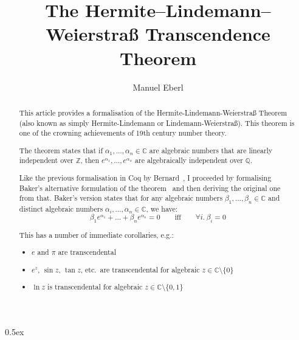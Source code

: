\documentclass[11pt,a4paper]{article}
\begin{document}
\title{The Hermite--Lindemann--Weierstraß Transcendence Theorem}
\author{Manuel Eberl}
\maketitle

\begin{abstract}
This article provides a formalisation of the Her\-mite\--Lin\-de\-mann\--Wei\-er\-straß Theorem
(also known as simply Her\-mite\--Lin\-de\-mann or Lin\-de\-mann\--Wei\-er\-straß).
 This theorem is one of the crowning achievements of 19th century number theory.

The theorem states that if $\alpha_1, \ldots, \alpha_n\in\mathbb{C}$ are algebraic numbers that
are linearly independent over $\mathbb{Z}$, then $e^{\alpha_1},\ldots,e^{\alpha_n}$ are
algebraically independent over $\mathbb{Q}$.

Like the previous formalisation in Coq by Bernard~\cite{bernard}, I proceeded by formalising 
Baker's alternative formulation of the theorem~\cite{baker} and then deriving the original one from
that. Baker's version states that for any algebraic numbers
$\beta_1, \ldots, \beta_n\in\mathbb{C}$ and distinct algebraic numbers
$\alpha_i, \ldots, \alpha_n\in\mathbb{C}$, we have:
\[\beta_1 e^{\alpha_1} + \ldots + \beta_n e^{\alpha_n} = 0 \quad\quad\text{iff}\quad\quad
  \forall i.\ \beta_i = 0\]

This has a number of immediate corollaries, e.g.:
\begin{itemize}
\item $e$ and $\pi$ are transcendental
\item $e^z$, $\sin z$, $\tan z$, etc.\ are transcendental for algebraic $z\in\mathbb{C}\setminus\{0\}$
\item $\ln z$ is transcendental for algebraic $z\in\mathbb{C}\setminus\{0, 1\}$
\end{itemize}
\end{abstract}

\newpage
\tableofcontents
\newpage
\parindent 0pt\parskip 0.5ex



\nocite{baker}
\nocite{redheffer_steinberg}
\nocite{bernard}



\end{document}
